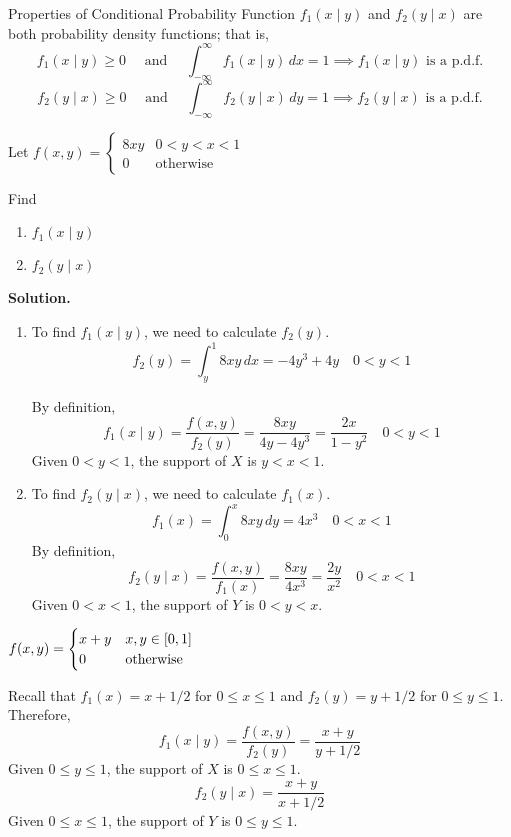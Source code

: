 \begin{Proposition}{Properties of Conditional Probability Function}{}
    $ f_1(x\mid y) $ and $ f_2(y\mid x) $ are both probability density functions;
    that is,
    \[ f_1(x\mid y)\geqslant 0 \quad\text{ and }\quad
        \int_{-\infty}^{\infty} f_1(x\mid y)\, d{x} =1\implies f_1(x\mid y)\text{ is a p.d.f.}\]
    \[ f_2(y\mid x)\geqslant 0 \quad\text{ and }\quad
        \int_{-\infty}^{\infty} f_2(y\mid x)\, d{y}=1\implies f_2(y\mid x)\text{ is a p.d.f.}\]
\end{Proposition}
\begin{Example}{}{}
    Let $ \displaystyle f(x,y)=\begin{cases}
            8 x y & 0<y<x<1          \\
            0     & \text{otherwise}
        \end{cases}  $

    Find
    \begin{enumerate}[label=(\roman*)]
        \item $ f_1(x\mid y) $
        \item $ f_2(y\mid x) $
    \end{enumerate}
    \textbf{Solution.}
    \begin{enumerate}[label=(\roman*)]
        \item To find $ f_1(x\mid y) $, we need to calculate
              $ f_2(y) $.
              \[ f_2(y)=\int_{y}^{1} 8xy\, d{x}=-4y^3+4y \quad 0<y<1 \]

              By definition,
              \[ f_1(x\mid y)=\frac{f(x,y)}{f_2(y)}=
                  \frac{8xy}{4y-4y^3}=\frac{2x}{1-y^2} \quad 0<y<1 \]
              Given $ 0<y<1 $, the support
              of $ X $ is $ y<x<1 $.
        \item To find $ f_2(y\mid x) $, we need to calculate $ f_1(x) $.
              \[ f_1(x)=\int_{0}^{x} 8xy\, d{y}=4x^3\quad 0<x<1 \]
              By definition,
              \[ f_2(y\mid x)=\frac{f(x,y)}{f_1(x)} =\frac{8xy}{4x^3} =\frac{2y}{x^2} \quad 0<x<1 \]
              Given $ 0<x<1 $, the support of $ Y $ is $ 0<y<x $.
    \end{enumerate}
\end{Example}
\begin{Example}{}{}
    $ \displaystyle f(x,y)=\begin{cases}
            x+y & x,y\in\interval{0}{1} \\
            0   & \text{otherwise}
        \end{cases} $

    Recall that $ f_1(x)=x+1/2 $ for $ 0\leqslant x\leqslant 1 $ and
    $ f_2(y)=y+1/2 $ for $ 0\leqslant y\leqslant 1 $. Therefore,
    \[ f_1(x\mid y)=\frac{f(x,y)}{f_2(y)} =\frac{x+y}{y+1/2} \]
    Given $ 0\leqslant y\leqslant 1 $, the support of $ X $ is $ 0\leqslant x\leqslant 1 $.
    \[ f_2(y\mid x)=\frac{x+y}{x+1/2} \]
    Given $ 0\leqslant x\leqslant 1 $, the support of $ Y $ is $ 0\leqslant y\leqslant 1 $.
\end{Example}
